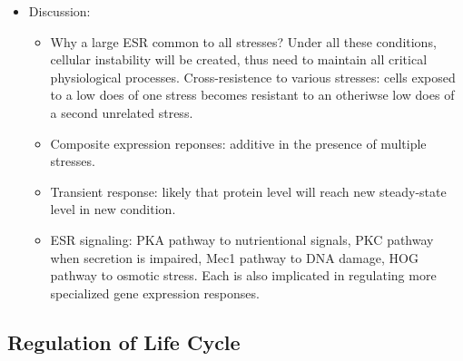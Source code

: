 \documentclass{report}
\begin{document}
\begin{itemize}
	\item Discussion: 
	\begin{itemize}
		\item Why a large ESR common to all stresses? Under all these conditions, cellular instability will be created, thus need to maintain all critical physiological processes. Cross-resistence to various stresses: cells exposed to a low does of one stress becomes resistant to an otheriwse low does of a second unrelated stress. 
		\item Composite expression reponses: additive in the presence of multiple stresses. 
		\item Transient response: likely that protein level will reach new steady-state level in new condition. 
		\item ESR signaling: PKA pathway to nutrientional signals, PKC pathway when secretion is impaired, Mec1 pathway to DNA damage, HOG pathway to osmotic stress. Each is also implicated in regulating more specialized gene expression responses. 
	\end{itemize}
\end{itemize}
\subsection{Regulation of Life Cycle}
\end{document}
